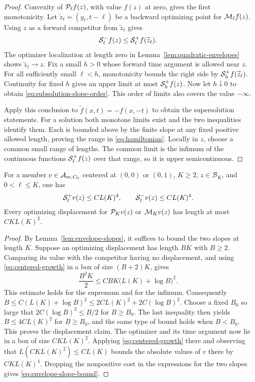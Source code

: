 \begin{proof}
Convexity of $\mathcal{P}_\ell f(z)$, with value $f(z)$ at zero,
gives the first monotonicity. Let
$\widetilde z_\ell=(y_\ell,t-\ell)$ be a backward optimizing
point for $\mathcal{M}_\ell f(z)$. Using $z$ as a forward competitor
from $\widetilde z_\ell$ gives
\[
  \mathcal{S}_\ell^-f(z)\le\mathcal{S}_\ell^+f(\widetilde z_\ell).
\]
The optimizer localization at length zero in
Lemma~\ref{lem:quadratic-envelopes} shows
$\widetilde z_\ell\to z$. Fix a small $h>0$ whose forward time
argument is allowed near $z$. For all sufficiently small
$\ell<h$, monotonicity bounds the right side by
$\mathcal{S}_h^+f(\widetilde z_\ell)$. Continuity for fixed $h$ gives
an upper limit at most $\mathcal{S}_h^+f(z)$. Now let $h\downarrow0$
to obtain \eqref{eq:subsolution-slope-order}. This order of
limits also covers the value $-\infty$.

Apply this conclusion to $\widetilde f(x,t)=-f(x,-t)$ to obtain
the supersolution statements. For a solution both monotone
limits exist and the two inequalities identify them. Each is
bounded above by the finite slope at any fixed positive allowed
length, proving the range in \eqref{eq:hamiltonian}. Locally in
$z$, choose a common small range of lengths. The common limit is
the infimum of the continuous functions $\mathcal{S}_\ell^+f(z)$ over
that range, so it is upper semicontinuous.
\end{proof}

\begin{lemma}\label{lem:fitted-envelope-bounds}
For a member $v\in\mathcal{A}_{m,C_0}$ centered at $(0,0)$ or $(0,1)$, $K\ge2$,
$z\in\mathcal B_K$, and $0<\ell\le K$, one has
\begin{equation}\label{eq:envelope-slope-bound}
  \mathcal{S}_\ell^+v(z)\le C L(K)^4,\qquad
  \mathcal{S}_\ell^-v(z)\le C L(K)^4.
\end{equation}
Every optimizing displacement for $\mathcal{P}_Kv(z)$ or
$\mathcal{M}_Kv(z)$ has length at most $C K L(K)^2$.
\end{lemma}

\begin{proof}
By Lemma~\ref{lem:envelope-slopes}, it suffices to bound the two
slopes at length $K$. Suppose an optimizing displacement has
length $BK$ with $B\ge2$. Comparing its value with the
competitor having no displacement, and using
\eqref{eq:centered-growth} in a box of size $(B+2)K$, gives
\[
  \frac{B^2K}{2}
     \le C BK\bigl(L(K)+\log B\bigr)^2.
\]
This estimate holds for the supremum and for the infimum.
Consequently
$B\le C(L(K)+\log B)^2\le2C L(K)^2+2C(\log B)^2$.
Choose a fixed $B_0$ so large that
$2C(\log B)^2\le B/2$ for $B\ge B_0$. The last inequality
then yields $B\le4C L(K)^2$ for $B\ge B_0$, and the same type
of bound holds when $B<B_0$. This proves the displacement
claim. The optimizer and its time argument now lie in a box of
size $C K L(K)^2$. Applying \eqref{eq:centered-growth} there
and observing that $L(C K L(K)^2)\le C L(K)$ bounds the
absolute values of $v$ there by $C K L(K)^4$. Dropping the
nonpositive cost in the expressions for the two slopes gives
\eqref{eq:envelope-slope-bound}.
\end{proof}

